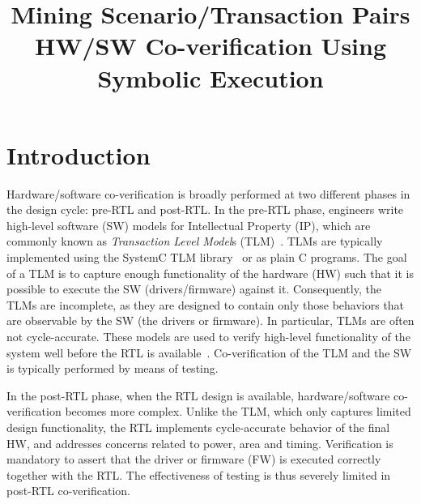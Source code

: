 \documentclass[sigconf]{acmart}
\title{Mining Scenario/Transaction Pairs HW/SW Co-verification Using Symbolic Execution}
\begin{document}
\renewcommand\footnotetextcopyrightpermission[1]{} %
\pagestyle{plain} %

\maketitle

%
\section{Introduction}
Hardware/software co-verification is broadly performed at two different
phases in the design cycle: pre-RTL and post-RTL.  In the pre-RTL phase,
engineers write high-level software (SW) models for Intellectual Property (IP), 
which are commonly known as {\em Transaction Level Model}s
(TLM)~\cite{codes14}.  TLMs are typically implemented using the SystemC TLM
library~\cite{tlm} or as plain C programs.  The goal of a TLM is to capture
enough functionality of the hardware (HW) such that it is possible to execute the
SW (drivers/firmware) against it.  Consequently, the TLMs are
incomplete, as they are designed to contain only those behaviors that are
observable by the SW (the drivers or firmware).  In particular, TLMs
are often not cycle-accurate.  These models are used to verify high-level
functionality of the system well before the RTL is
available~\cite{codes14,codes15}. Co-verification of the TLM and the
SW is typically performed by means of testing.

In the post-RTL phase, when the RTL design is available, hardware/software
co-verification becomes more complex.  Unlike the TLM, which only captures
limited design functionality, the RTL implements cycle-accurate behavior
of the final HW, and addresses concerns related to power, area and
timing.  Verification is mandatory to assert that the driver or firmware (FW) 
is executed correctly together with the RTL.  The effectiveness of testing 
is thus severely limited in post-RTL co-verification.
\end{document}
